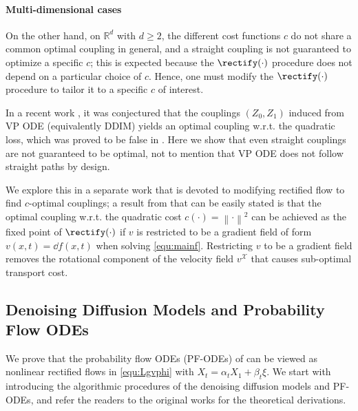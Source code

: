 \documentclass[11pt]{article}
\newcommand{\X}{\mathcal{X}}
\newcommand{\RR}{\mathbb{R}}
\newcommand{\norm}[1]{\left\|#1\right\|}
\begin{document}
\paragraph{Multi-dimensional cases} 
On the other hand, 
on $\RR^d$ with $d\geq 2$, 
the different cost functions $c$  do not share a common optimal coupling in general, 
and a straight coupling is not guaranteed to optimize 
a specific $c$; this is expected because the $\rectify(\cdot)$ procedure does not depend on a particular choice of $c$.
Hence, one must modify the $\rectify(\cdot)$ procedure 
to tailor it to a specific $c$ of interest. 


In a recent work 
\cite{khrulkov2022understanding}, 
it was  conjectured that the couplings $(Z_0,Z_1)$ induced from VP ODE (equivalently DDIM) yields an optimal coupling w.r.t. the quadratic loss, which was proved to be false in  \cite{lavenant2022flow, tanana2021comparison}. 
Here we show that 
even straight couplings 
are not guaranteed to be optimal, not to mention that VP ODE does not follow straight paths by design. 

We explore this in a separate work  \cite{rectifyOT} that is devoted to
modifying rectified flow to  find 
$c$-optimal couplings;
a result 
from \cite{rectifyOT} 
that can be easily stated 
is that 
the optimal coupling 
w.r.t. the quadratic cost $c(\cdot)=\norm{\cdot}^2$ 
can be achieved as the fixed point of $\rectify(\cdot)$ 
if $v$ is restricted to be a gradient field of form $v(x,t) = \dd f(x,t)$ 
when solving \eqref{equ:mainf}. Restricting $v$ to be a gradient field removes the rotational component of the velocity field $v^\X$ that causes sub-optimal transport cost.

 





\subsection{Denoising Diffusion Models and Probability Flow ODEs}  
\label{sec:diffusion}
We prove that the probability flow ODEs (PF-ODEs) of \cite{song2020score} can be viewed as  nonlinear rectified flows in \eqref{equ:Lgvphi} with $X_t = \alpha_t X_1 + \beta_t \xi.$ 
We start with introducing the algorithmic procedures of the denoising diffusion models and PF-ODEs, and refer the readers to the original works \cite{song2020score, ho2020denoising, song2020denoising} for the theoretical derivations. 
\end{document}
